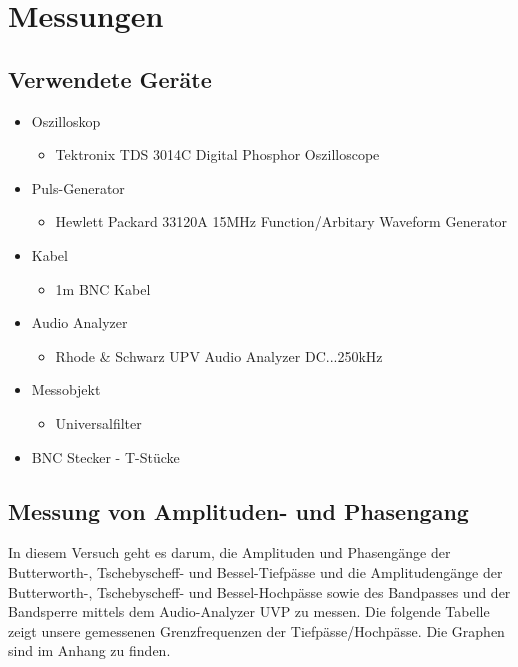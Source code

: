 \section{Messungen}
\subsection{Verwendete Geräte}

	\begin{itemize}
		\item Oszilloskop
		\begin{itemize}
			\item Tektronix TDS 3014C Digital Phosphor Oszilloscope
		\end{itemize}
		
		\item Puls-Generator
		\begin{itemize}
			\item Hewlett Packard 33120A 15MHz Function/Arbitary Waveform Generator
		\end{itemize}
		
		\item Kabel
		\begin{itemize}
			\item 1m BNC Kabel
		\end{itemize}
		
		\item Audio Analyzer
		\begin{itemize}
			\item Rhode \& Schwarz UPV Audio Analyzer DC...250kHz
		\end{itemize}
		
		\item Messobjekt
		\begin{itemize}
			\item Universalfilter
		\end{itemize}
		
		\item BNC Stecker - T-Stücke
	\end{itemize}


\newpage

\subsection{Messung von Amplituden- und Phasengang}
\noindent In diesem Versuch geht es darum, die Amplituden und Phasengänge der Butterworth-, Tschebyscheff- und Bessel-Tiefpässe und die Amplitudengänge der Butterworth-, Tschebyscheff- und Bessel-Hochpässe sowie des Bandpasses und der Bandsperre mittels dem Audio-Analyzer UVP zu messen. Die folgende Tabelle zeigt unsere gemessenen Grenzfrequenzen der Tiefpässe/Hochpässe. Die Graphen sind im Anhang zu finden.

